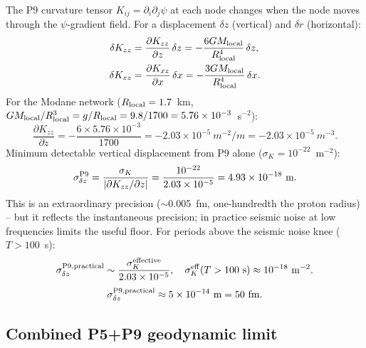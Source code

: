 \documentclass[aps,prd,twocolumn,superscriptaddress,nofootinbib,longbibliography]{revtex4-2}
\begin{document}
The P9 curvature tensor $K_{ij} = \partial_i\partial_j\psi$ at each node
changes when the node moves through the $\psi$-gradient field.  For a
displacement $\delta z$ (vertical) and $\delta r$ (horizontal):
\begin{align}
\delta K_{zz} &= \frac{\partial K_{zz}}{\partial z}\,\delta z
= -\frac{6GM_{\rm local}}{R_{\rm local}^4}\,\delta z,\nonumber\\
\delta K_{xz} &= \frac{\partial K_{xz}}{\partial x}\,\delta x
= -\frac{3GM_{\rm local}}{R_{\rm local}^4}\,\delta x.
\end{align}
For the Modane network ($R_{\rm local} = 1.7$~km, $GM_{\rm local}/R_{\rm local}^3
= g/R_{\rm local} = 9.8/1700 = 5.76\times10^{-3}$~s$^{-2}$):
\begin{equation}
\frac{\partial K_{zz}}{\partial z} = -\frac{6\times5.76\times10^{-3}}{1700}
= -2.03\times10^{-5}\ \si{m^{-2}/m} = -2.03\times10^{-5}\ \si{m^{-3}}.
\end{equation}
Minimum detectable vertical displacement from P9 alone
($\sigma_K = 10^{-22}$~m$^{-2}$):
\begin{equation}
\sigma_{\delta z}^{\rm P9}
= \frac{\sigma_K}{|\partial K_{zz}/\partial z|}
= \frac{10^{-22}}{2.03\times10^{-5}} = 4.93\times10^{-18}\ \si{m}.
\end{equation}
This is an extraordinary precision ($\sim$0.005~fm, one-hundredth the
proton radius) -- but it reflects the instantaneous precision; in practice
seismic noise at low frequencies limits the useful floor.  For periods
above the seismic noise knee ($T > 100$~s):
\begin{equation}
\sigma_{\delta z}^{\rm P9,practical}
\sim\frac{\sigma_K^{\rm effective}}{2.03\times10^{-5}},\quad
\sigma_K^{\rm eff}(T > 100\ \text{s}) \approx 10^{-18}\ \si{m^{-2}}.
\end{equation}
\begin{equation}
\sigma_{\delta z}^{\rm P9,practical} \approx 5\times10^{-14}\ \si{m} = 50\ \si{fm}.
\end{equation}

\subsection{Combined P5+P9 geodynamic limit}
\end{document}
